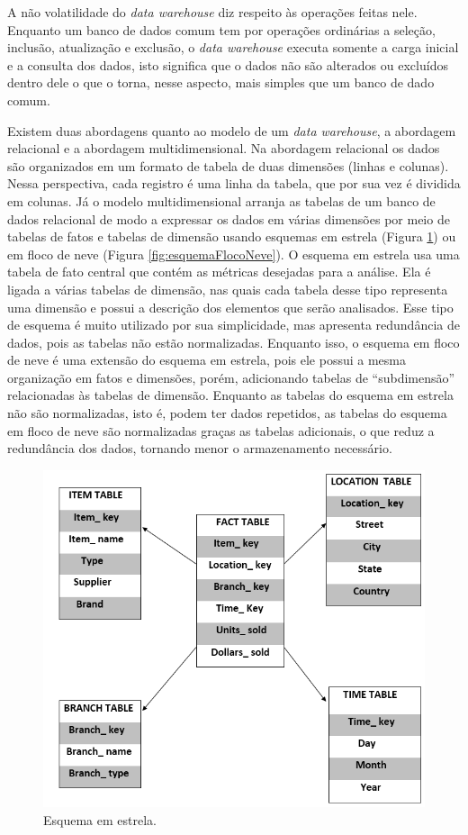 A não volatilidade do \textit{data warehouse} diz respeito às operações feitas nele. Enquanto um banco de dados comum tem por operações ordinárias a seleção, inclusão, atualização e exclusão, o \textit{data warehouse} executa somente a carga inicial e a consulta dos dados, isto significa que o dados não são alterados ou excluídos dentro dele o que o torna, nesse aspecto, mais simples que um banco de dado comum.

Existem duas abordagens quanto ao modelo de um \textit{data warehouse}, a abordagem relacional e a abordagem multidimensional. Na abordagem relacional os dados são organizados em um formato de tabela de duas dimensões (linhas e colunas). Nessa perspectiva, cada registro é uma linha da tabela, que por sua vez é dividida em colunas. Já o modelo multidimensional arranja as tabelas de um banco de dados relacional de modo a expressar os dados em várias dimensões por meio de tabelas de fatos e tabelas de dimensão usando esquemas em estrela (Figura \ref{fig:esquemaEstrela}) ou em floco de neve (Figura \ref{fig:esquemaFlocoNeve}). O esquema em estrela usa uma tabela de fato central que contém as métricas desejadas para a análise. Ela é ligada a várias tabelas de dimensão, nas quais cada tabela desse tipo representa uma dimensão e possui a descrição dos elementos que serão analisados. Esse tipo de esquema é muito utilizado por sua simplicidade, mas apresenta redundância de dados, pois as tabelas não estão normalizadas. Enquanto isso, o esquema em floco de neve é uma extensão do esquema em estrela, pois ele possui a mesma organização em fatos e dimensões, porém, adicionando tabelas de \enquote{subdimensão} relacionadas às tabelas de dimensão. Enquanto as tabelas do esquema em estrela não são normalizadas, isto é, podem ter dados repetidos, as tabelas do esquema em floco de neve são normalizadas graças as tabelas adicionais, o que reduz a redundância dos dados, tornando menor o armazenamento necessário.

\begin{figure}[ht]
\centering
\includegraphics[width=.8\textwidth]{imagens/example-star-schema.png}
\caption{Esquema em estrela.}
\author{Fonte: https://www.educba.com/star-schema-vs-snowflake-schema/}
\label{fig:esquemaEstrela}
\end{figure}

